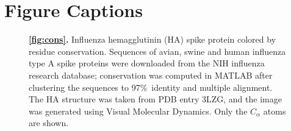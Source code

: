 \section*{Figure Captions}
\renewcommand\thefigure{}
\newcommand\fnum[1]{\textbf{\ref{fig:#1}.} }
%
\begin{figure}[!hb]
\centering
{}
\caption{\fnum{cons}
Influenza hemagglutinin (HA) spike protein colored by residue conservation. Sequences of avian, swine and human influenza type A 
spike proteins 
were downloaded from the NIH influenza research database\cite{bao08}; conservation was computed in MATLAB\cite{matlab} after
clustering the sequences to 97\%~identity and multiple alignment. The HA structure was taken from PDB entry 3LZG\cite{xu10}, and the image was generated
using Visual Molecular Dynamics.\cite{Humphrey96} Only the $C_\alpha$ atoms are shown.
}
\end{figure}
%
